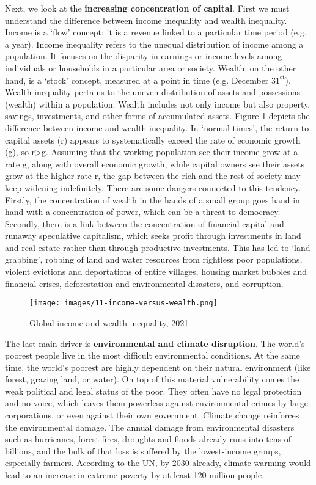 \documentclass[../summary.tex]{subfiles}
\begin{document}
Next, we look at the \textbf{increasing concentration of capital}. First we must understand the difference between income inequality and wealth inequality. Income is a `flow' concept: it is a revenue linked to a particular time period (e.g. a year). Income inequality refers to the unequal distribution of income among a population. It focuses on the disparity in earnings or income levels among individuals or households in a particular area or society. Wealth, on the other hand, is a `stock' concept, measured at a point in time (e.g. December $\mathrm{31^{st}}$). Wealth inequality pertains to the uneven distribution of assets and possessions (wealth) within a population. Wealth includes not only income but also property, savings, investments, and other forms of accumulated assets. Figure \ref{fig:income-versus-wealth} depicts the difference between income and wealth inequality. In `normal times', the return to capital assets (r) appears to systematically exceed the rate of economic growth (g), so r>g. Assuming that the working population see their income grow at a rate g, along with overall economic growth, while capital owners see their assets grow at the higher rate r, the gap between the rich and the rest of society may keep widening indefinitely. There are some dangers connected to this tendency. Firstly, the concentration of wealth in the hands of a small group goes hand in hand with a concentration of power, which can be a threat to democracy. Secondly, there is a link between the concentration of financial capital and runaway speculative capitalism, which seeks profit through investments in land and real estate rather than through productive investments. This has led to `land grabbing', robbing of land and water resources from rightless poor populations, violent evictions and deportations of entire villages, housing market bubbles and financial crises, deforestation and environmental disasters, and corruption.
\\
\begin{figure}[htbp]
	\centering
	\texttt{[image: images/11-income-versus-wealth.png]}
	\caption{Global income and wealth inequality, 2021}
	\label{fig:income-versus-wealth}
\end{figure}

The last main driver is \textbf{environmental and climate disruption}. The world's poorest people live in the most difficult environmental conditions. At the same time, the world's poorest are highly dependent on their natural environment (like forest, grazing land, or water). On top of this material vulnerability comes the weak political and legal status of the poor. They often have no legal protection and no voice, which leaves them powerless against environmental crimes by large corporations, or even against their own government. Climate change reinforces the environmental damage. The annual damage from environmental disasters such as hurricanes, forest fires, droughts and floods already runs into tens of billions, and the bulk of that loss is suffered by the lowest-income groups, especially farmers. According to the UN, by 2030 already, climate warming would lead to an increase in extreme poverty by at least 120 million people.
\newpage
\end{document}
